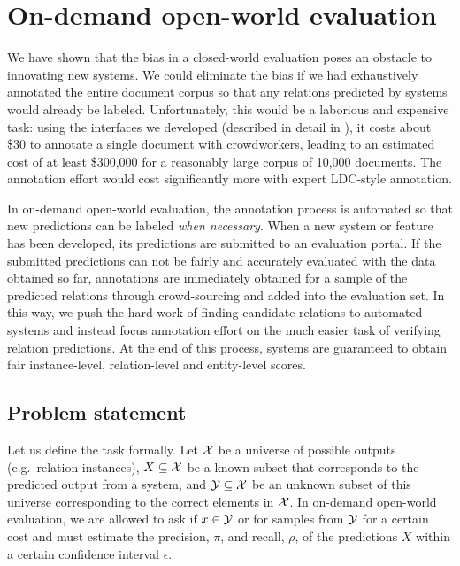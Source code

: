 \section{On-demand open-world evaluation}
\label{sec:methodology}

We have shown that the bias in a closed-world evaluation poses an obstacle to innovating new systems.
We could eliminate the bias if we had exhaustively annotated the entire document corpus so that any relations predicted by systems would already be labeled.
Unfortunately, this would be a laborious and expensive task:
  using the interfaces we developed (described in detail in ), it costs about \$30 to annotate a single document with crowdworkers, leading to an estimated cost of at least \$300,000 for a reasonably large corpus of 10,000 documents.
The annotation effort would cost significantly more with expert LDC-style annotation.

In on-demand open-world evaluation, the annotation process is automated so that new predictions can be labeled \textit{when necessary}.
When a new system or feature has been developed, its predictions are submitted to an evaluation portal.
If the submitted predictions can not be fairly and accurately evaluated with the data obtained so far,
  annotations are immediately obtained for a sample of the predicted relations through crowd-sourcing and added into the evaluation set.
In this way, we push the hard work of finding candidate relations to automated systems and instead focus annotation effort on the much easier task of verifying relation predictions.
At the end of this process, systems are guaranteed to obtain fair instance-level, relation-level and entity-level scores.

\subsection{Problem statement}

Let us define the task formally.
Let $\mathcal{X}$ be a universe of possible outputs (e.g.\ relation instances),
  $X \subseteq \mathcal{X}$ be a known subset that corresponds to the predicted output from a system,
  and $\mathcal{Y} \subseteq \mathcal{X}$ be an unknown subset of this universe corresponding to the correct elements in $\mathcal{X}$.
In on-demand open-world evaluation, we are allowed to ask if $x \in \mathcal{Y}$ or for samples from $\mathcal{Y}$ for a certain cost and must estimate the precision, $\pi$, and recall, $\rho$, of the predictions $X$ within a certain confidence interval $\epsilon$.

